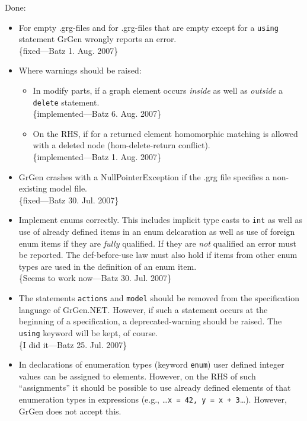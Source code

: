 \documentclass[12pt,a4paper]{article}
\begin{document}
\noindent
Done:
\begin{itemize}
	\item For empty .grg-files and for .grg-files that are empty except for a {\tt using} statement GrGen wrongly reports an error.\\
		\{fixed---Batz 1. Aug. 2007\}
	
	\item Where warnings should be raised:
		\begin{itemize}
			\item In modify parts, if a graph element occurs \emph{inside} as well as \emph{outside} a {\tt delete} statement.\\
				\{implemented---Batz 6. Aug. 2007\}
			\item On the RHS, if for a returned element homomorphic matching is allowed with a deleted node (hom-delete-return conflict).\\
				\{implemented---Batz 1. Aug. 2007\}
		\end{itemize}
    \item GrGen crashes with a NullPointerException if the .grg file specifies a non-existing model file.\\
		\{fixed---Batz 30. Jul. 2007\}
	\item Implement enums correctly. This includes implicit type casts to {\tt int} as well as use of already defined items in an enum delcaration as well as use of foreign enum items if they are \emph{fully} qualified.
		If they are \emph{not} qualified an error must be reported.
		The def-before-use law must also hold if items from other enum types are used in the definition of an enum item.\\
		\{Seems to work now---Batz 30. Jul. 2007\}
	\item The statements {\tt actions} and {\tt model} should be removed from the specification language of GrGen.NET.
		However, if such a statement occurs at the beginning of a specification, a deprecated-warning should be raised.
		The {\tt using} keyword will be kept, of course.\\
		\{I did it---Batz 25. Jul. 2007\}
	\item In declarations of enumeration types (keyword {\tt enum}) user defined integer values can be assigned to elements.
	  However, on the RHS of such "`assignments"' it should be possible to use already defined elements of that enumeration types in expressions (e.g., \dots{}{\tt{}x = 42, y = x + 3}\dots). However, GrGen does not accept this.\\

\end{itemize}
\end{document}
